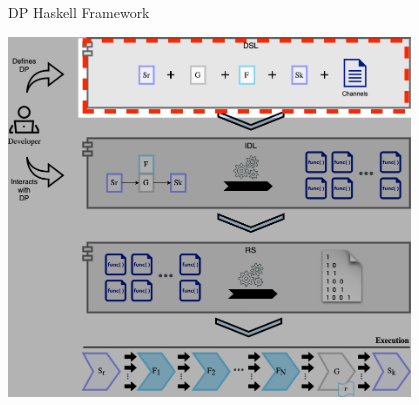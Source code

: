 \documentclass{beamer}
\begin{document}
    \begin{frame}[fragile]{DP Haskell Framework}
      \begin{center}
      \includegraphics[width = 0.8\textwidth, height = 0.8\textheight]{dpf_haskell_v3-1}
    \end{center}
  \end{frame}

\end{document}
